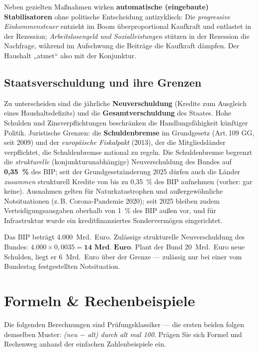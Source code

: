 \documentclass[11pt, a4paper]{article}
\begin{document}
Neben gezielten Maßnahmen wirken \textbf{automatische (eingebaute) Stabilisatoren} ohne
politische Entscheidung antizyklisch: Die \emph{progressive Einkommensteuer} entzieht im
Boom überproportional Kaufkraft und entlastet in der Rezession; \emph{Arbeitslosengeld und
Sozialleistungen} stützen in der Rezession die Nachfrage, während im Aufschwung die
Beiträge die Kaufkraft dämpfen. Der Haushalt „atmet`` also mit der Konjunktur.

\subsection{Staatsverschuldung und ihre Grenzen}

Zu unterscheiden sind die jährliche \textbf{Neuverschuldung} (Kredite zum Ausgleich eines
Haushaltsdefizits) und die \textbf{Gesamtverschuldung} des Staates. Hohe Schulden und
Zinsverpflichtungen beschränken die Handlungsfähigkeit künftiger Politik. Juristische
Grenzen: die \textbf{Schuldenbremse} im Grundgesetz (Art.\,109 GG, seit 2009) und der
\emph{europäische Fiskalpakt} (2013), der die Mitgliedsländer verpflichtet, die
Schuldenbremse national zu regeln. Die Schuldenbremse begrenzt die \emph{strukturelle}
(konjunkturunabhängige) Neuverschuldung des Bundes auf \textbf{0,35~\%} des BIP; seit der
Grundgesetzänderung 2025 dürfen auch die Länder \emph{zusammen} strukturell Kredite von
bis zu 0,35~\% des BIP aufnehmen (vorher: gar keine). Ausnahmen gelten für
Naturkatastrophen und außergewöhnliche Notsituationen (z.\,B. Corona-Pandemie 2020);
seit 2025 bleiben zudem Verteidigungsausgaben oberhalb von 1~\% des BIP außen vor, und für
Infrastruktur wurde ein kreditfinanziertes Sondervermögen eingerichtet.

\begin{beispiel}
Das BIP beträgt 4.000~Mrd.~Euro. Zulässige strukturelle Neuverschuldung des Bundes:
$4.000 \times 0{,}0035 = \textbf{14~Mrd.~Euro}$. Plant der Bund 20~Mrd.~Euro neue
Schulden, liegt er 6~Mrd.~Euro über der Grenze --- zulässig nur bei einer vom Bundestag
festgestellten Notsituation.
\end{beispiel}

\section{Formeln \& Rechenbeispiele}

Die folgenden Berechnungen sind Prüfungsklassiker --- die ersten beiden folgen demselben
Muster: \emph{(neu $-$ alt) durch alt mal 100}. Prägen Sie sich Formel und Rechenweg
anhand der einfachen Zahlenbeispiele ein.
\end{document}
